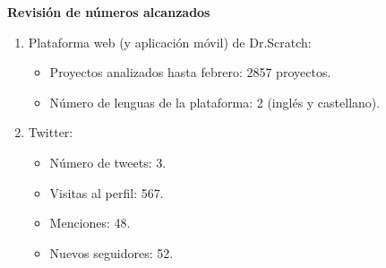 \documentclass[a4paper,12pt]{letter}
\begin{document}
\begin{letter}
\vspace{0.75cm}
\textbf{{\LARGE Revisión de números alcanzados}}
\vspace{0.5cm}

\begin{enumerate}
    \item {Plataforma web (y aplicación móvil) de Dr.Scratch:}
        \begin{itemize}
            \item {Proyectos analizados hasta febrero: 2857 proyectos.}
            \item {Número de lenguas de la plataforma: 2 (inglés y castellano).}
        \end{itemize}
    \item {Twitter:}
        \begin{itemize}
            \item {Número de tweets: 3.}
            \item {Visitas al perfil: 567.}
            \item {Menciones: 48.}
            \item {Nuevos seguidores: 52.}
        \end{itemize}
    
\end{enumerate}


\end{letter}
\end{document}
